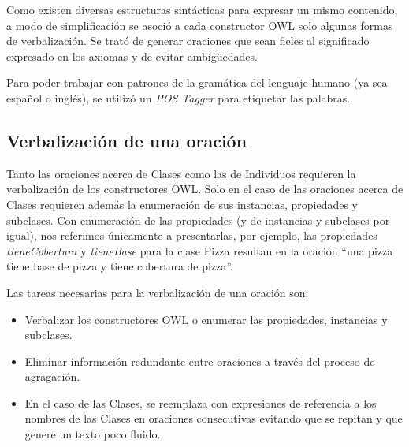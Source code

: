 Como existen diversas estructuras sintácticas para expresar un mismo contenido, a modo de simplificación se asoció a cada constructor OWL solo algunas formas de verbalización. Se trató de generar oraciones que sean fieles al significado expresado en los axiomas y de evitar ambigüedades.

Para poder trabajar con patrones de la gramática del lenguaje humano (ya sea español o inglés), se utilizó un \emph{POS Tagger} para etiquetar las palabras.

\subsection{Verbalización de una oración}
Tanto las oraciones acerca de Clases como las de Individuos requieren la verbalización de los constructores OWL. Solo en el caso de las oraciones acerca de Clases requieren además la enumeración de sus instancias, propiedades y subclases. Con enumeración de las propiedades (y de instancias y subclases por igual), nos referimos únicamente a presentarlas, por ejemplo, las propiedades \emph{tieneCobertura} y \emph{tieneBase} para la clase Pizza resultan en la oración ``una pizza tiene base de pizza y tiene cobertura de pizza''.

Las tareas necesarias para la verbalización de una oración son:
\begin{itemize}
    \item Verbalizar los constructores OWL o enumerar las propiedades, instancias y subclases.
    \item Eliminar información redundante entre oraciones a través del proceso de agragación.
    \item En el caso de las Clases, se reemplaza con expresiones de referencia a los nombres de las Clases en oraciones consecutivas evitando que se repitan y que genere un texto poco fluido.
\end{itemize}


